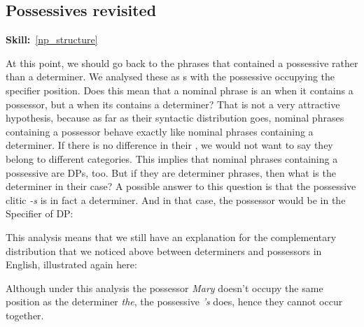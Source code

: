 \documentclass{article}
\begin{document}
\subsection{Possessives revisited}
\hfill{}\textbf{Skill:}~\ref{np_structure}

At this point, we should go back to the phrases that contained a possessive  rather than a determiner.
We analysed these as s with the possessive occupying the specifier position.
Does this mean that a nominal phrase is an  when it contains a possessor, but a  when its contains a determiner?
That is not a very attractive hypothesis, because as far as their syntactic distribution goes, nominal phrases containing a possessor behave exactly like nominal phrases containing a determiner.
If there is no difference in their , we would not want to say they belong to different categories.
This implies that nominal phrases containing a possessive  are DPs, too.
But if they are determiner phrases, then what is the determiner in their case?
A possible answer to this question is that the possessive clitic \emph{-s} is in fact a determiner. And in that case, the possessor would be in the Specifier of DP:
\begin{exe}
\end{exe}
This analysis means that we still have an explanation for the complementary distribution that we noticed above between determiners and possessors in English, illustrated again here:
\begin{exe}
\end{exe}
Although under this analysis the possessor \emph{Mary} doesn't occupy the same position as the determiner \emph{the}, the possessive \emph{'s} does, hence they cannot occur together.
\end{document}
